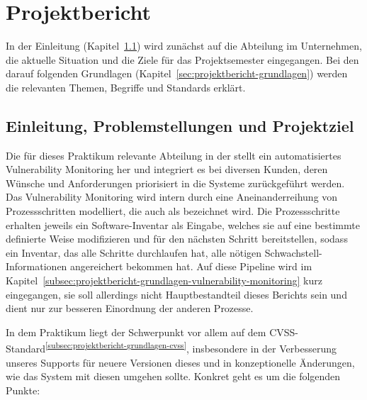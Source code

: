 

\chapter{Projektbericht} \label{ch:projektbericht}

In der Einleitung (Kapitel\ \ref{sec:projektbericht-projektziel}) wird zunächst auf die Abteilung im Unternehmen, die aktuelle Situation und die Ziele für das Projektsemester eingegangen.
Bei den darauf folgenden Grundlagen (Kapitel\ \ref{sec:projektbericht-grundlagen}) werden die relevanten Themen, Begriffe und Standards erklärt.


\section{Einleitung, Problemstellungen und Projektziel} \label{sec:projektbericht-projektziel}

Die für dieses Praktikum relevante Abteilung in der {\metaeffekt} stellt ein automatisiertes Vulnerability Monitoring her und integriert es bei diversen Kunden, deren Wünsche und Anforderungen priorisiert in die Systeme zurückgeführt werden.
Das Vulnerability Monitoring wird intern durch eine Aneinanderreihung von Prozessschritten modelliert, die auch als  bezeichnet wird.
Die Prozessschritte erhalten jeweils ein Software-Inventar als Eingabe, welches sie auf eine bestimmte definierte Weise modifizieren und für den nächsten Schritt bereitstellen, sodass ein Inventar, das alle Schritte durchlaufen hat, alle nötigen Schwachstell-Informationen angereichert bekommen hat.
Auf diese Pipeline wird im Kapitel\ \ref{subsec:projektbericht-grundlagen-vulnerability-monitoring} kurz eingegangen, sie soll allerdings nicht Hauptbestandteil dieses Berichts sein und dient nur zur besseren Einordnung der anderen Prozesse.

In dem Praktikum liegt der Schwerpunkt vor allem auf dem CVSS-Standard\textsuperscript{\ref{subsec:projektbericht-grundlagen-cvss}}, insbesondere in der Verbesserung unseres Supports für neuere Versionen dieses und in konzeptionelle Änderungen, wie das System mit diesen umgehen sollte.
Konkret geht es um die folgenden Punkte:

